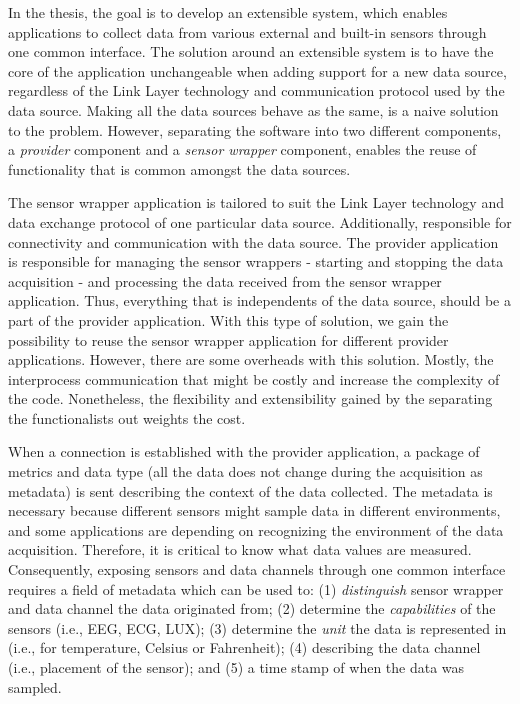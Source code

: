 In the thesis, the goal is to develop an extensible system, which enables applications to collect data from various external and built-in sensors through one common interface. The solution around an extensible system is to have the core of the application unchangeable when adding support for a new data source, regardless of the Link Layer technology and communication protocol used by the data source. Making all the data sources behave as the same, is a naive solution to the problem. However, separating the software into two different components, a \textit{provider} component and a \textit{sensor wrapper} component, enables the reuse of functionality that is common amongst the data sources. 

The sensor wrapper application is tailored to suit the Link Layer technology and data exchange protocol of one particular data source. Additionally, responsible for connectivity and communication with the data source. The provider application is responsible for managing the sensor wrappers - starting and stopping the data acquisition - and processing the data received from the sensor wrapper application. Thus, everything that is independents of the data source, should be a part of the provider application. With this type of solution, we gain the possibility to reuse the sensor wrapper application for different provider applications. However, there are some overheads with this solution. Mostly, the interprocess communication that might be costly and increase the complexity of the code. Nonetheless, the flexibility and extensibility gained by the separating the functionalists out weights the cost.

When a connection is established with the provider application, a package of metrics and data type (all the data does not change during the acquisition as metadata) is sent describing the context of the data collected. The metadata is necessary because different sensors might sample data in different environments, and some applications are depending on recognizing the environment of the data acquisition. Therefore, it is critical to know what data values are measured. Consequently, exposing sensors and data channels through one common interface requires a field of metadata which can be used to: (1) \textit{distinguish} sensor wrapper and data channel the data originated from; (2) determine the \textit{capabilities} of the sensors (i.e., EEG, ECG, LUX); (3) determine the \textit{unit} the data is represented in (i.e., for temperature, Celsius or Fahrenheit); (4) describing the data channel (i.e., placement of the sensor); and (5) a time stamp of when the data was sampled. 

